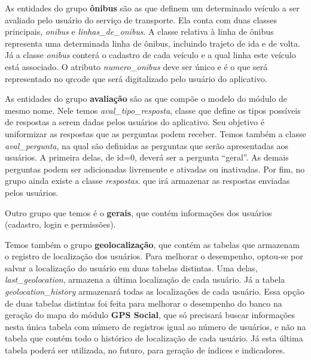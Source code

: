 As entidades do grupo \textbf{ônibus} são as que definem um determinado veículo a ser avaliado pelo usuário do serviço de transporte. Ela conta com duas classes principais, \textit{onibus} e \textit{linhas\_de\_onibus}. A classe relativa à linha de ônibus representa uma determinada linha de ônibus, incluindo trajeto de ida e de volta. Já a classe \textit{onibus} conterá o cadastro de cada veículo e a qual linha este veículo está associado. O atributo \textit{numero\_onibus} deve ser único e é o que será representado no \gls{qrcode} que será digitalizado pelo usuário do aplicativo.

As entidades do grupo \textbf{avaliação} são as que compõe o modelo do módulo de mesmo nome. Nele temos \textit{aval\_tipo\_resposta}, classe que define os tipos possíveis de respostas a serem dadas pelos usuários do aplicativo. Seu objetivo é uniformizar as respostas que as perguntas podem receber. Temos também a classe \textit{aval\_pergunta}, na qual são definidas as perguntas que serão apresentadas aos usuários. A primeira delas, de id=0, deverá ser a pergunta ``geral''. As demais perguntas podem ser adicionadas livremente e ativadas ou inativadas. Por fim, no grupo ainda existe a classe \textit{respostas}. que irá armazenar as respostas enviadas pelos usuários.

Outro grupo que temos é o \textbf{gerais}, que contém informações dos usuários (cadastro, login e permissões).

Temos também o grupo \textbf{geolocalização}, que contém as tabelas que armazenam o registro de localização dos usuários. Para melhorar o desempenho, optou-se por salvar a localização do usuário em duas tabelas distintas. Uma delas, \textit{last\_geolocation}, armazena a última localização de cada usuário. Já a tabela \textit{geolocation\_history} armazenará todas as localizações de cada usuário. Essa opção de duas tabelas distintas foi feita para melhorar o desempenho do banco na geração do mapa do módulo \textbf{GPS Social}, que só precisará buscar informações nesta única tabela com número de registros igual ao número de usuários, e não na tabela que contém todo o histórico de localização de cada usuário. Já esta última tabela poderá ser utilizada, no futuro, para geração de índices e indicadores.

